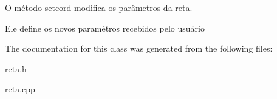 O método setcord modifica os parâmetros da reta. 

Ele define os novos paramêtros recebidos pelo usuário 

The documentation for this class was generated from the following files\+:\begin{DoxyCompactItemize}
\item 
reta.\+h\item 
reta.\+cpp\end{DoxyCompactItemize}
